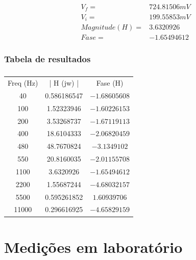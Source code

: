 \documentclass[12pt,twoside, a4paper, twocolumn]{article}
\begin{document}
\begin{equation*}
    \begin{aligned}
         & V_f =          & 724.81506mV \\
         & V_i =          & 199.55853mV \\
         & Magnitude(H) = & 3.6320926   \\
         & Fase =         & -1.65494612
    \end{aligned}
\end{equation*}






\subsubsection{Tabela de resultados}












\subparagraph*{}




\begin{center}
    \begin{tabular}{ |c|c|c| }
        \hline
        Freq (Hz) & | H (jw) |  & Fase (H)      \\
        40        & 0.586186547 & $-1.68605608$ \\
        100       & 1.52323946  & $-1.60226153$ \\
        200       & 3.53268737  & $-1.67119113$ \\
        400       & 18.6104333  & $-2.06820459$ \\
        480       & 48.7670824  & $-3.1349102$  \\
        550       & 20.8160035  & $-2.01155708$ \\
        1100      & 3.6320926   & $-1.65494612$ \\
        2200      & 1.55687244  & $-4.68032157$ \\
        5500      & 0.595261852 & $1.60939706$  \\
        11000     & 0.296616925 & $-4.65829159$ \\
        \hline
    \end{tabular}
\end{center}
\newpage
\section{Medições em laboratório}
\end{document}
